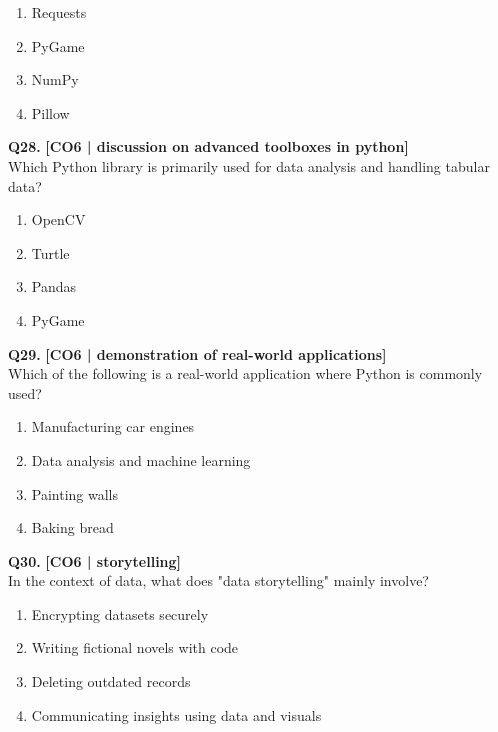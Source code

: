 \begin{enumerate}[label=(\alph*),topsep=2pt,itemsep=1pt,partopsep=0pt,parsep=0pt]
    \item \relax Requests
    \item \relax PyGame
    \item \relax NumPy
    \item \relax Pillow
\end{enumerate}
\vspace{{2mm}}

\noindent\textbf{Q28.} \hfill {\small\color{LPUOrange}\textbf{[CO6 | discussion on advanced toolboxes in python]}}\\[2pt]
Which Python library is primarily used for data analysis and handling tabular data?

\begin{enumerate}[label=(\alph*),topsep=2pt,itemsep=1pt,partopsep=0pt,parsep=0pt]
    \item \relax OpenCV
    \item \relax Turtle
    \item \relax Pandas
    \item \relax PyGame
\end{enumerate}
\vspace{{2mm}}

\noindent\textbf{Q29.} \hfill {\small\color{LPUOrange}\textbf{[CO6 | demonstration of real-world applications]}}\\[2pt]
Which of the following is a real-world application where Python is commonly used?

\begin{enumerate}[label=(\alph*),topsep=2pt,itemsep=1pt,partopsep=0pt,parsep=0pt]
    \item \relax Manufacturing car engines
    \item \relax Data analysis and machine learning
    \item \relax Painting walls
    \item \relax Baking bread
\end{enumerate}
\vspace{{2mm}}

\noindent\textbf{Q30.} \hfill {\small\color{LPUOrange}\textbf{[CO6 | storytelling]}}\\[2pt]
In the context of data, what does "data storytelling" mainly involve?

\begin{enumerate}[label=(\alph*),topsep=2pt,itemsep=1pt,partopsep=0pt,parsep=0pt]
    \item \relax Encrypting datasets securely
    \item \relax Writing fictional novels with code
    \item \relax Deleting outdated records
    \item \relax Communicating insights using data and visuals
\end{enumerate}
\vspace{{2mm}}

